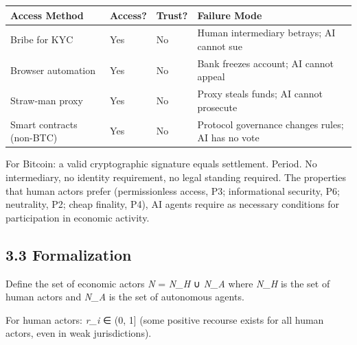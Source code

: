 \documentclass[12pt]{article}
\theoremstyle{definition}
\theoremstyle{remark}
\begin{document}
{%
\begin{longtable}[]{@{}
  >{\raggedright\arraybackslash}p{}
  >{\raggedright\arraybackslash}p{}
  >{\raggedright\arraybackslash}p{}
  >{\raggedright\arraybackslash}p{}@{}}
\toprule\noalign{}
\begin{minipage}[b]{\linewidth}\raggedright
Access Method
\end{minipage} & \begin{minipage}[b]{\linewidth}\raggedright
Access?
\end{minipage} & \begin{minipage}[b]{\linewidth}\raggedright
Trust?
\end{minipage} & \begin{minipage}[b]{\linewidth}\raggedright
Failure Mode
\end{minipage} \\
\midrule\noalign{}
\endhead
\bottomrule\noalign{}
\endlastfoot
Bribe for KYC & Yes & No & Human intermediary betrays; AI cannot sue \\
Browser automation & Yes & No & Bank freezes account; AI cannot
appeal \\
Straw-man proxy & Yes & No & Proxy steals funds; AI cannot prosecute \\
Smart contracts (non-BTC) & Yes & No & Protocol governance changes
rules; AI has no vote \\
\end{longtable}
}

For Bitcoin: a valid cryptographic signature equals settlement. Period.
No intermediary, no identity requirement, no legal standing required.
The properties that human actors prefer (permissionless access, P3;
informational security, P6; neutrality, P2; cheap finality, P4), AI
agents require as necessary conditions for participation in economic
activity.

\subsection{3.3 Formalization}\label{formalization}

Define the set of economic actors \emph{N} = \emph{N\_H} ∪ \emph{N\_A}
where \emph{N\_H} is the set of human actors and \emph{N\_A} is the set
of autonomous agents.

For human actors: \emph{r\_i} ∈ (0, 1{]} (some positive recourse exists
for all human actors, even in weak jurisdictions).
\end{document}

